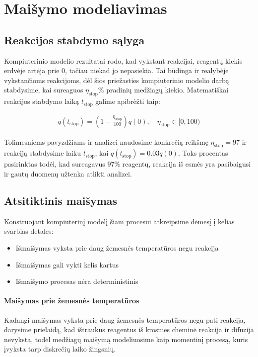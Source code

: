 
\section{Maišymo modeliavimas}

\subsection{Reakcijos stabdymo sąlyga}

Kompiuterinio modelio rezultatai rodo, kad vykstant reakcijai, reagentų kiekis erdvėje artėja prie 0, tačiau niekad jo nepasiekia. Tai būdinga ir realybėje vykstančioms reakcijoms, dėl šios priežasties kompiuterinio modelio darbą stabdysime, kai sureaguos $\eta_\text{stop}\%$ pradinių medžiagų kiekio. Matematiškai reakcijos stabdymo laiką $t_\text{stop}$ galime apibrėžti taip:

\begin{align}
    q(t_\text{stop})=\left(1-\frac{\eta_\text{stop}}{100}\right)q(0),\quad \eta_\text{stop}\in[0, 100)
\end{align}

Tolimesniems pavyzdžiams ir analizei naudosime konkrečią reikšmę $\eta_\text{stop}=97$ ir reakciją stabdysime laiku $t_\text{stop}$, kai $q(t_\text{stop})=0.03q(0)$. Toks procentas pasirinktas todėl, kad sureagavus 97\% reagentų, reakcija iš esmės yra pasibaigusi ir gautų duomenų užtenka atlikti analizei.

\subsection{Atsitiktinis maišymas}

Konstruojant kompiuterinį modelį šiam procesui atkreipsime dėmesį į kelias svarbias detales:

\begin{itemize}
  \item Išmaišymas vyksta prie daug žemesnės temperatūros negu reakcija
  \item Išmaišymas gali vykti kelis kartus
  \item Išmaišymo procesas nėra deterministinis
\end{itemize}

\paragraph{Maišymas prie žemesnės temperatūros}

Kadangi maišymas vyksta prie daug žemesnės temperatūros negu pati reakcija, darysime prielaidą, kad ištraukus reagentus iš krosnies cheminė reakcija ir difuzija nevyksta, todėl medžiagų maišymą modeliuosime kaip momentinį procesą, kuris įvyksta tarp diskrečių laiko žingsnių.

